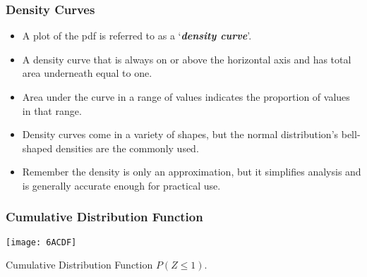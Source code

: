 \documentclass[a4]{beamer}
\begin{document}
\begin{frame}

\frametitle{Density Curves}


\begin{itemize}
\item A plot of the pdf is referred to as a `\textbf{\emph{density curve}}'.
\item A density curve that is always on or above the horizontal axis and has total area underneath equal to one.
\item Area under the curve in a range of values indicates the proportion of values in that range.
\item Density curves come in a variety of shapes, but the normal distribution's bell-shaped densities are the commonly used.
\item Remember the density is only an approximation, but it simplifies analysis and is generally accurate enough for practical use.
\end{itemize}
\end{frame}
\begin{frame}
\frametitle{Cumulative Distribution Function}

\vspace{-0.5cm}
\begin{center}
\texttt{[image: 6ACDF]}

\end{center}
Cumulative Distribution Function $P(Z \leq 1)$.
\end{frame}
\end{document}
